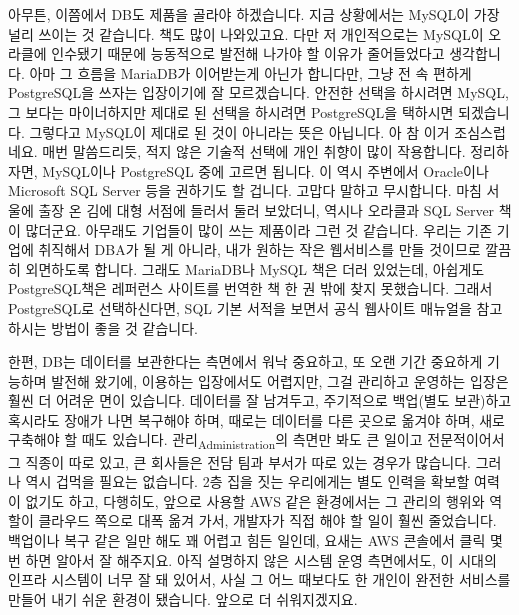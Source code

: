 \documentclass[11pt,a4paper]{article}
\newcommand{\sub}[1]{\textsubscript{#1}}
\begin{document}
아무튼, 이쯤에서 DB도 제품을 골라야 하겠습니다. 지금 상황에서는 MySQL이 가장 널리 쓰이는 것 같습니다. 책도 많이 나와있고요. 다만 저 개인적으로는 MySQL이 오라클에 인수됐기 때문에 능동적으로 발전해 나가야 할 이유가 줄어들었다고 생각합니다. 아마 그 흐름을 MariaDB가 이어받는게 아닌가 합니다만, 그냥 전 속 편하게 PostgreSQL을 쓰자는 입장이기에 잘 모르겠습니다. 안전한 선택을 하시려면 MySQL, 그 보다는 마이너하지만 제대로 된 선택을 하시려면 PostgreSQL을 택하시면 되겠습니다. 그렇다고 MySQL이 제대로 된 것이 아니라는 뜻은 아닙니다. 아 참 이거 조심스럽네요. 매번 말씀드리듯, 적지 않은 기술적 선택에 개인 취향이 많이 작용합니다. 정리하자면, MySQL이나 PostgreSQL 중에 고르면 됩니다. 이 역시 주변에서 Oracle이나 Microsoft SQL Server 등을 권하기도 할 겁니다. 고맙다 말하고 무시합니다. 마침 서울에 출장 온 김에 대형 서점에 들러서 둘러 보았더니, 역시나 오라클과 SQL Server 책이 많더군요. 아무래도 기업들이 많이 쓰는 제품이라 그런 것 같습니다. 우리는 기존 기업에 취직해서 DBA가 될 게 아니라, 내가 원하는 작은 웹서비스를 만들 것이므로 깔끔히 외면하도록 합니다. 그래도 MariaDB나 MySQL 책은 더러 있었는데, 아쉽게도 PostgreSQL책은 레퍼런스 사이트를 번역한 책 한 권 밖에 찾지 못했습니다. 그래서 PostgreSQL로 선택하신다면, SQL 기본 서적을 보면서 공식 웹사이트 매뉴얼을 참고하시는 방법이 좋을 것 같습니다.

한편, DB는 데이터를 보관한다는 측면에서 워낙 중요하고, 또 오랜 기간 중요하게 기능하며 발전해 왔기에, 이용하는 입장에서도 어렵지만, 그걸 관리하고 운영하는 입장은 훨씬 더 어려운 면이 있습니다. 데이터를 잘 남겨두고, 주기적으로 백업(별도 보관)하고 혹시라도 장애가 나면 복구해야 하며, 때로는 데이터를 다른 곳으로 옮겨야 하며, 새로 구축해야 할 때도 있습니다.  관리\sub{Administration}의 측면만 봐도 큰 일이고 전문적이어서 그 직종이 따로 있고, 큰 회사들은 전담 팀과 부서가 따로 있는 경우가 많습니다. 그러나 역시 겁먹을 필요는 없습니다. 2층 집을 짓는 우리에게는 별도 인력을 확보할 여력이 없기도 하고, 다행히도, 앞으로 사용할 AWS 같은 환경에서는 그 관리의 행위와 역할이 클라우드 쪽으로 대폭 옮겨 가서, 개발자가 직접 해야 할 일이 훨씬 줄었습니다. 백업이나 복구 같은 일만 해도 꽤 어렵고 힘든 일인데, 요새는 AWS 콘솔에서 클릭 몇 번 하면 알아서 잘 해주지요. 아직 설명하지 않은 시스템 운영 측면에서도, 이 시대의 인프라 시스템이 너무 잘 돼 있어서, 사실 그 어느 때보다도 한 개인이 완전한 서비스를 만들어 내기 쉬운 환경이 됐습니다. 앞으로 더 쉬워지겠지요.
\end{document}
